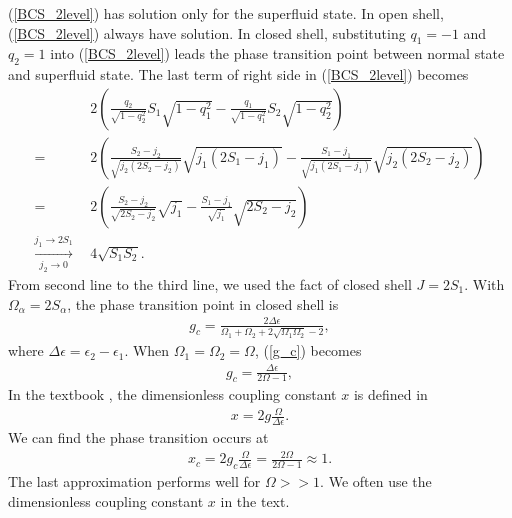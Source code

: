 \documentclass[11pt]{book} %
\begin{document}
(\ref{BCS_2level}) has solution only for the superfluid state. In open shell, (\ref{BCS_2level}) always have solution. In closed shell, substituting $q_1=-1$ and $q_2=1$ into (\ref{BCS_2level}) leads the phase transition point between normal state and superfluid state. The last term of right side in (\ref{BCS_2level}) becomes
\begin{align*}
	& 2\left(\frac{q_2}{\sqrt{1-q_2^2}}S_1\sqrt{1-q_1^2}
	-\frac{q_1}{\sqrt{1-q_1^2}}S_2\sqrt{1-q_2^2}\right) \\
	=\ \ & 2\left(\frac{S_2-j_2}{\sqrt{j_2(2S_2-j_2)}}\sqrt{j_1(2S_1-j_1)}
	- \frac{S_1-j_1}{\sqrt{j_1(2S_1-j_1)}}\sqrt{j_2(2S_2-j_2)}\right) \\
	=\ \ & 2\left(\frac{S_2-j_2}{\sqrt{2S_2-j_2}}\sqrt{j_1}
	- \frac{S_1-j_1}{\sqrt{j_1}}\sqrt{2S_2-j_2}\right) \\ 
	\xrightarrow[j_2\to0]{j_1\to2S_1}\ \ &  4 \sqrt{S_1S_2} .
\end{align*}
From second line to the third line, we used the fact of closed shell $J=2S_1$. With $\Omega_{\alpha}=2S_{\alpha}$, the phase transition point in closed shell is
\begin{align}
	g_c = \frac{2\Delta\epsilon}{\Omega_1+\Omega_2+2\sqrt{\Omega_1\Omega_2}-2} ,
	\label{g_c}
\end{align}
where $\Delta\epsilon=\epsilon_2-\epsilon_1$. When $\Omega_1=\Omega_2=\Omega$, (\ref{g_c}) becomes
\begin{align}
	g_c = \frac{\Delta\epsilon}{2\Omega-1} ,
	\label{g_2}
\end{align}
In the textbook \cite{}, the dimensionless coupling constant $x$ is defined in
\begin{align}
	x = 2g \frac{\Omega}{\Delta\epsilon} .
	\label{x}
\end{align}
We can find the phase transition occurs at
\begin{align}
	x_c = 2g_c \frac{\Omega}{\Delta\epsilon} = \frac{2\Omega}{2\Omega-1} \approx 1.
	\label{x_c}
\end{align}
The last approximation performs well for $\Omega>>1$. We often use the dimensionless coupling constant $x$ in the text. 


\end{document}
